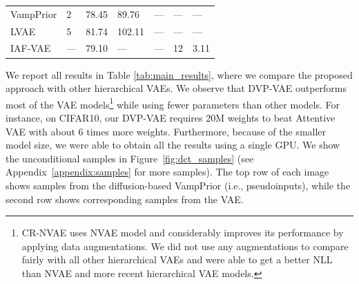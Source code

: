 \begin{table}[t]
{\begin{tabular}{l||lll|lll}
            VampPrior \small{\citep{tomczak2018vae}} & \multirow{1}{*}{2}
                    & \multirow{1}{*}{78.45}  &   \multirow{1}{*}{89.76}             
                    & --- & --- & --- \\
            LVAE \small{\citep{sonderby2016ladder}} & \multirow{1}{*}{5}
                    & \multirow{1}{*}{81.74} & \multirow{1}{*}{102.11}     
                    & --- & --- & --- \\
            IAF-VAE\small{\citep{kingma2016improved}} & \multirow{1}{*}{---}
                    & \multirow{1}{*}{79.10}  &   \multirow{1}{*}{---}             
                    & --- & 12 & 3.11 \\
            \bottomrule
        \end{tabular}%
        \vskip 10pt
        }
 \end{table} 
We report all results in Table \ref{tab:main_results}, where we compare the proposed approach with other hierarchical VAEs. 
We observe that DVP-VAE outperforms most of the VAE models\footnote{CR-NVAE \citep{sinha2021consistency} uses NVAE model and considerably improves its performance by applying data augmentations. We did not use any augmentations to compare fairly with all other hierarchical VAEs and were able to get a better NLL than NVAE and more recent hierarchical VAE models.
} while using fewer parameters than other models. For instance, on CIFAR10, our DVP-VAE requires 20M weights to beat Attentive VAE with about 6 times more weights.
Furthermore, because of the smaller model size, we were able to obtain all the results using a single GPU. 
We show the unconditional samples in Figure~\ref{fig:dct_samples} (see Appendix~\ref{appendix:samples} for more samples). 
The top row of each image shows samples from the diffusion-based VampPrior (i.e., pseudoinputs), while the second row shows corresponding samples from the VAE. 
